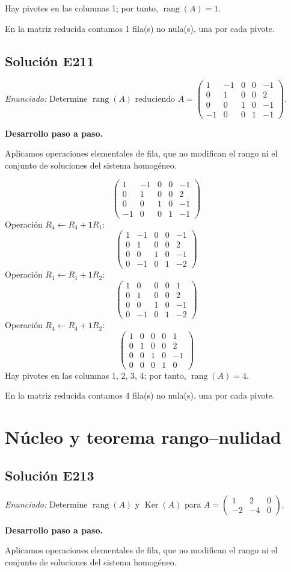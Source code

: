\documentclass[12pt]{article}
\theoremstyle{remark}
\newcommand{\rang}{\operatorname{rang}}
\newcommand{\Ker}{\operatorname{Ker}}
\newcommand{\solucion}[2]{\Needspace{11\baselineskip}\subsection*{Solución E#1}\noindent\textit{Enunciado:} #2\par\medskip\noindent\textbf{Desarrollo paso a paso.}\par\medskip}
\begin{document}
Hay pivotes en las columnas 1; por tanto, $\boxed{\rang(A)=1}$.

En la matriz reducida contamos 1 fila(s) no nula(s), una por cada pivote.


\medskip

\solucion{211}{Determine $\rang(A)$ reduciendo $A=\begin{pmatrix}1&-1&0&0&-1\\0&1&0&0&2\\0&0&1&0&-1\\-1&0&0&1&-1\end{pmatrix}$.}
Aplicamos operaciones elementales de fila, que no modifican el rango ni el conjunto de soluciones del sistema homogéneo.

\[
\begin{pmatrix}1&-1&0&0&-1\\0&1&0&0&2\\0&0&1&0&-1\\-1&0&0&1&-1\end{pmatrix}
\]
Operación $R_{4}\leftarrow R_{4}+1R_{1}$:
\[
\begin{pmatrix}1&-1&0&0&-1\\0&1&0&0&2\\0&0&1&0&-1\\0&-1&0&1&-2\end{pmatrix}
\]
Operación $R_{1}\leftarrow R_{1}+1R_{2}$:
\[
\begin{pmatrix}1&0&0&0&1\\0&1&0&0&2\\0&0&1&0&-1\\0&-1&0&1&-2\end{pmatrix}
\]
Operación $R_{4}\leftarrow R_{4}+1R_{2}$:
\[
\begin{pmatrix}1&0&0&0&1\\0&1&0&0&2\\0&0&1&0&-1\\0&0&0&1&0\end{pmatrix}
\]
Hay pivotes en las columnas 1, 2, 3, 4; por tanto, $\boxed{\rang(A)=4}$.

En la matriz reducida contamos 4 fila(s) no nula(s), una por cada pivote.


\medskip

\section{Núcleo y teorema rango--nulidad}

\solucion{213}{Determine $\rang(A)$ y $\Ker(A)$ para $A=\begin{pmatrix}1&2&0\\-2&-4&0\end{pmatrix}$.}
Aplicamos operaciones elementales de fila, que no modifican el rango ni el conjunto de soluciones del sistema homogéneo.
\end{document}
